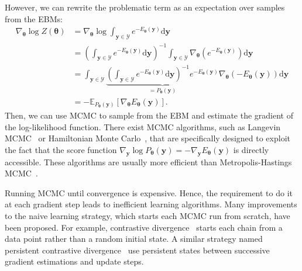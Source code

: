 However, we can rewrite the problematic term as an expectation over samples from the EBMs:
\begin{align}
\nabla_{\bm{\theta}} \log Z(\bm{\theta}) &= \nabla_{\bm{\theta}} \log \int_{\bm{y}\in \mathcal{Y}}e^{-E_{\bm{\theta}}(\bm{y})} \text{d}\bm{y}\\
&= \left( \int_{\bm{y}\in \mathcal{Y}}e^{-E_{\bm{\theta}}(\bm{y})} \text{d}\bm{y} \right)^{-1} \int_{\bm{y}\in \mathcal{Y}}
\nabla_{\bm{\theta}}\left( e^{-E_{\bm{\theta}}(\bm{y})}  \right) \text{d}\bm{y}\\
&= \int_{\bm{y}\in \mathcal{Y}} \underbrace{\left( \int_{\bm{y}\in \mathcal{Y}}e^{-E_{\bm{\theta}}(\bm{y})} \text{d}\bm{y} \right)^{-1}
e^{-E_{\bm{\theta}}(\bm{y})}}_{=P_{\bm{\theta}}(\bm{y})} \nabla_{\bm{\theta}}\left(-E_{\bm{\theta}}(\bm{y})\right) \text{d}\bm{y}\\
&= -\mathbb{E}_{P_{\bm{\theta}}(\bm{y})}\left[ \nabla_{\bm{\theta}}E_{\bm{\theta}}(\bm{y}) \right].
\end{align}
Then, we can use MCMC to sample from the EBM and estimate the gradient of the log-likelihood function. There exist MCMC algorithms, such as Langevin MCMC~\citep{parisi1981correlation, grenander1994representations} or Hamiltonian Monte Carlo~\citep{duane1987hybrid, neal2011mcmc}, that are specifically designed to exploit the fact that the score function $\nabla_{\bm{y}} \log P_{\bm{\theta}}(\bm{y}) = -\nabla_{\bm{y}} E_{\bm{\theta}}(\bm{y})$ is directly accessible. These algorithms are usually more efficient than Metropolis-Hastings MCMC~\citep{hastings1970monte}.

Running MCMC until convergence is expensive. Hence, the requirement to do it at each gradient step leads to inefficient learning algorithms. Many improvements to the naive learning strategy, which starts each MCMC run from scratch, have been proposed. For example, contrastive divergence~\citep{hinton2002training} starts each chain from a data point rather than a random initial state. A similar strategy named persistent contrastive divergence~\citep{tieleman2008training} use persistent states between successive gradient estimations and update steps.
%

